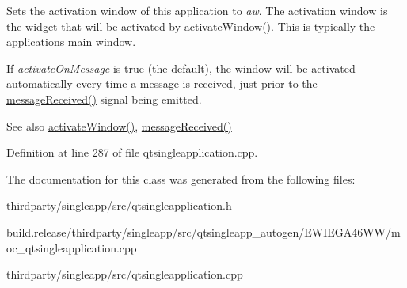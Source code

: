 Sets the activation window of this application to {\itshape aw}. The activation window is the widget that will be activated by \hyperlink{class_qt_single_application_a0881b32c76132b499f3180064006abc1}{activate\+Window()}. This is typically the application\textquotesingle{}s main window.

If {\itshape activate\+On\+Message} is true (the default), the window will be activated automatically every time a message is received, just prior to the \hyperlink{class_qt_single_application_a69340cef3d26d026e11424930e5a5866}{message\+Received()} signal being emitted.

\begin{DoxySeeAlso}{See also}
\hyperlink{class_qt_single_application_a0881b32c76132b499f3180064006abc1}{activate\+Window()}, \hyperlink{class_qt_single_application_a69340cef3d26d026e11424930e5a5866}{message\+Received()} 
\end{DoxySeeAlso}


Definition at line 287 of file qtsingleapplication.\+cpp.



The documentation for this class was generated from the following files\+:\begin{DoxyCompactItemize}
\item 
thirdparty/singleapp/src/qtsingleapplication.\+h\item 
build.\+release/thirdparty/singleapp/src/qtsingleapp\+\_\+autogen/\+E\+W\+I\+E\+G\+A46\+W\+W/moc\+\_\+qtsingleapplication.\+cpp\item 
thirdparty/singleapp/src/qtsingleapplication.\+cpp\end{DoxyCompactItemize}
